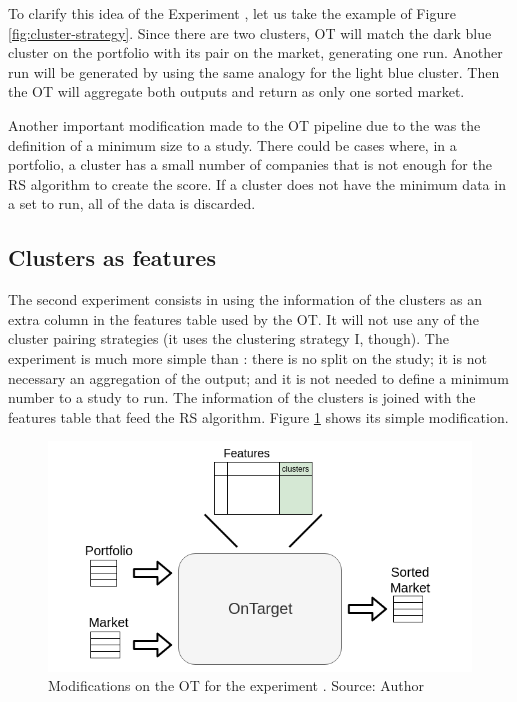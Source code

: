 To clarify this idea of the Experiment \nameExperimentI{}, let us take the example of Figure \ref{fig:cluster-strategy}. Since there are two clusters, OT will match the dark blue cluster on the portfolio with its pair on the market, generating one run. Another run will be generated by using the same analogy for the light blue cluster. Then the OT will aggregate both outputs and return as only one sorted market.

Another important modification made to the OT pipeline due to the \nameExperimentI{} was the definition of a minimum size to a study. There could be cases where, in a portfolio, a cluster has a small number of companies that is not enough for the RS algorithm to create the score. If a cluster does not have the minimum data in a set to run, all of the data is discarded.

\subsection{Clusters as features}

The second experiment consists in using the information of the clusters as an extra column in the features table used by the OT. It will not use any of the cluster pairing strategies (it uses the clustering strategy I, though). The experiment \nameExperimentII{} is much more simple than \nameExperimentI{}: there is no split on the study; it is not necessary an aggregation of the output; and it is not needed to define a minimum number to a study to run. The information of the clusters is joined with the features table that feed the RS algorithm. Figure \ref{fig:clusters-as-features} shows its simple modification.

\begin{figure}[H]
   \centering
   \includegraphics[width=\linewidth]{fig/ch3-clusters-as-features.png}
   \caption{Modifications on the OT for the experiment \nameExperimentII{}. Source: Author}
   \label{fig:clusters-as-features}
\end{figure}